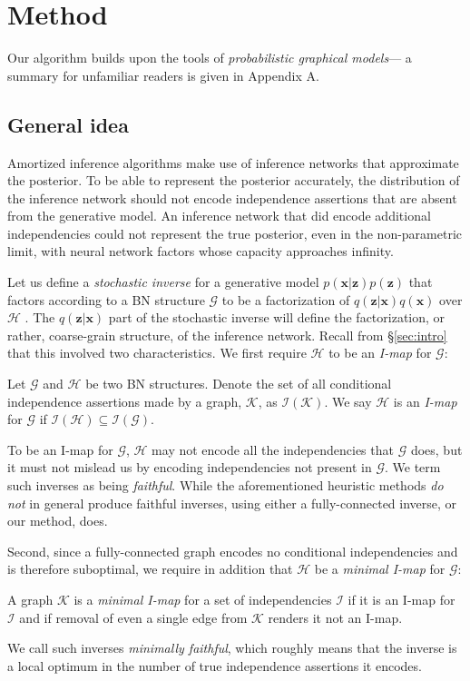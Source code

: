\section{Method}
Our algorithm builds upon the tools of \emph{probabilistic graphical models}--- a summary for unfamiliar readers is given in Appendix A.

\subsection{General idea}\label{sec:stochastic-inverses}
Amortized inference algorithms make use of inference networks that approximate the posterior.
To be able to represent the posterior accurately, the distribution of the inference network should not encode independence assertions that are absent from the generative model.
An inference network that did encode additional independencies could not represent the true posterior, even in the non-parametric limit, with neural network factors whose capacity approaches infinity.

Let us define a \emph{stochastic inverse} for a generative model $p(\mathbf{x}|\mathbf{z})p(\mathbf{z})$ that factors according to a BN structure $\mathcal{G}$ to be a factorization of $q(\mathbf{z}|\mathbf{x})q(\mathbf{x})$ over $\mathcal{H}$ \citep{StuhlmullerEtAl2013,PaigeWood2016}.
The $q(\mathbf{z}|\mathbf{x})$ part of the stochastic inverse will define the factorization, or rather, coarse-grain structure, of the inference network.
Recall from \S\ref{sec:intro} that this involved two characteristics.
We first require $\mathcal{H}$ to be an \emph{I-map} for $\mathcal{G}$:
\begin{definition}
	Let $\mathcal{G}$ and $\mathcal{H}$ be two BN structures.
Denote the set of all conditional independence assertions made by a graph, $\mathcal{K}$, as $\mathcal{I}(\mathcal{K})$.
We say $\mathcal{H}$ is an \emph{I-map} for $\mathcal{G}$ if $\mathcal{I}(\mathcal{H})\subseteq\mathcal{I}(\mathcal{G})$.
\end{definition}
To be an I-map for $\mathcal{G}$, $\mathcal{H}$ may not encode all the independencies that $\mathcal{G}$ does, but it must not mislead us by encoding independencies not present in $\mathcal{G}$.
We term such inverses as being \emph{faithful}.
While the aforementioned heuristic methods \emph{do not} in general produce faithful inverses, using either a fully-connected inverse, or our method, does.

Second, since a fully-connected graph encodes no conditional independencies and is therefore suboptimal, we require in addition that $\mathcal{H}$ be a \emph{minimal I-map} for $\mathcal{G}$:
\begin{definition}
	A graph $\mathcal{K}$ is a \emph{minimal I-map} for a set of independencies $\mathcal{I}$ if it is an I-map for $\mathcal{I}$ and if removal of even a single edge from $\mathcal{K}$ renders it not an I-map.
\end{definition}
We call such inverses \emph{minimally faithful}, which roughly means that the inverse is a local optimum in the number of true independence assertions it encodes.

